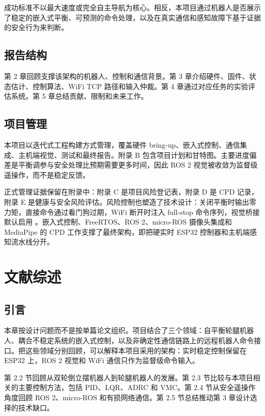 \documentclass[12pt, a4paper]{article}
\begin{document}
成功标准不以最大速度或完全自主导航为核心。相反，本项目通过机器人是否展示了稳定的嵌入式平衡、可预测的命令处理，以及在真实通信和感知故障下基于证据的安全行为来判断。

\subsection{报告结构}

第 2 章回顾支撑该架构的机器人、控制和通信背景。第 3 章介绍硬件、固件、状态估计、控制算法、WiFi TCP 路径和输入仲裁。第 4 章通过对应任务的实验评估系统。第 5 章总结贡献、限制和未来工作。

\subsection{项目管理}

本项目以迭代式工程构建方式管理，覆盖硬件 bring-up、嵌入式控制、通信集成、主机端视觉、测试和最终报告。附录 B 包含项目计划和甘特图。主要进度偏差是平衡调参与安全处理比预期需要更多时间，因此 ROS 2 视觉被收敛为监督级遥操作，而不是稳定反馈。

正式管理证据保留在附录中：附录 C 是项目风险登记表，附录 D 是 CPD 记录，附录 E 是健康与安全风险评估。风险控制也塑造了技术设计：关闭平衡时输出零力矩，直接命令通过看门狗过期，WiFi 断开时注入 full-stop 命令序列，视觉桥接默认启用 \texttt{}。嵌入式控制、FreeRTOS、ROS 2、micro-ROS 摄像头集成和 MediaPipe 的 CPD 工作支撑了最终架构，即把硬实时 ESP32 控制器和主机端感知流水线分开。



\section{文献综述}

\subsection{引言}

本章按设计问题而不是按单篇论文组织。项目结合了三个领域：自平衡轮腿机器人、耦合不稳定系统的嵌入式控制，以及非确定性通信链路上的远程机器人命令接口。把这些领域分别回顾，可以解释本项目采用的架构：实时稳定控制保留在 ESP32 上，ROS 2 视觉和 WiFi 通信只作为监督级命令输入。

第 2.2 节回顾从双轮倒立摆机器人到轮腿机器人的发展。第 2.3 节比较与本项目相关的主要控制方法，包括 PID、LQR、ADRC 和 VMC。第 2.4 节从安全遥操作角度回顾 ROS 2、micro-ROS 和有损网络通信。第 2.5 节总结推动第 3 章设计选择的技术缺口。
\end{document}

